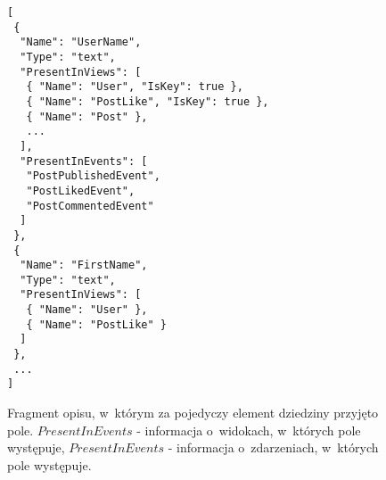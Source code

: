 \begin{figure}[!ht]
\begin{verbatim}
[
 {
  "Name": "UserName",
  "Type": "text",
  "PresentInViews": [
   { "Name": "User", "IsKey": true },
   { "Name": "PostLike", "IsKey": true },
   { "Name": "Post" },
   ...
  ],
  "PresentInEvents": [
   "PostPublishedEvent",
   "PostLikedEvent",
   "PostCommentedEvent"
  ]
 },
 {
  "Name": "FirstName",
  "Type": "text",
  "PresentInViews": [
   { "Name": "User" },
   { "Name": "PostLike" }
  ]
 },
 ...
]
\end{verbatim}
\caption{
 Fragment opisu, w~którym za pojedyczy element dziedziny przyjęto pole.
 $PresentInEvents$ - informacja o~widokach, w~których pole występuje, $PresentInEvents$ - informacja o~zdarzeniach, w~których pole występuje.
}
\label{fig:single:model_perField}
\end{figure}
